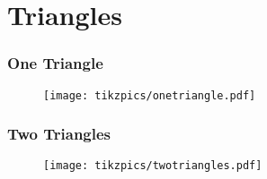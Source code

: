 \documentclass[../main.tex]{subfiles}
\begin{document}
\chapter{Triangles}

\subsection{One Triangle}

\begin{figure}[h!]
    \texttt{[image: tikzpics/onetriangle.pdf]}
\end{figure}

\subsection{Two Triangles}

\begin{figure}[h!]
    \texttt{[image: tikzpics/twotriangles.pdf]}
\end{figure}
\end{document}
